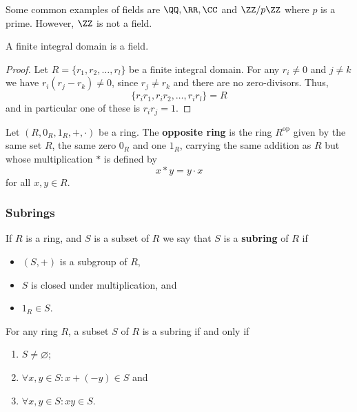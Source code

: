 \documentclass[12pt, a4paper]{article}
\begin{document}
\begin{example}
    Some common examples of fields are \(\QQ,\RR,\CC\) and \(\ZZ/p\ZZ\) where \(p\) is a prime. However, \(\ZZ\) is not a field.
\end{example}

\begin{theorem}
    A finite integral domain is a field.
\end{theorem}

\begin{proof}
    Let \( R = \{r_1,r_2,\ldots,r_l\} \) be a finite integral domain. For any \( r_i \neq 0 \) and \( j \neq k \) we have \( r_i(r_j - r_k) \neq 0 \), since \( r_j \neq r_k \) and there are no zero-divisors. Thus, 
    \[ \{r_ir_1,r_ir_2,\ldots,r_ir_l\} = R \] 
    and in particular one of these is \( r_ir_j = 1 \).
\end{proof}

\begin{definition}
    Let \((R,0_R,1_R,+,\cdot)\) be a ring. The \textbf{opposite ring} is the ring \(R^{\text{op}}\) given by the same set \(R\), the same zero \(0_R\) and one \(1_R\), carrying the same addition as \(R\) but whose multiplication \(*\) is defined by 
    \[x * y=y\cdot x\]
    for all \(x,y \in R\). 
\end{definition}

\subsubsection{Subrings}

\begin{definition}
    If \(R\) is a ring, and \(S\) is a subset of \(R\) we say that \(S\) is a \textbf{subring} of \(R\) if 
    \begin{itemize}
        \item \((S,+)\) is a subgroup of \(R\),
        \item \(S\)  is closed under multiplication, and
        \item \(1_R \in S\).
    \end{itemize}
\end{definition}

\begin{theorem}
    For any ring \(R\), a subset \(S\) of \(R\) is a subring if and only if
    \begin{enumerate}
        \item \(S \neq \varnothing\);
        \item \(\forall x,y \in S : x+(-y) \in S\) and
        \item \(\forall x,y \in S : xy \in S\).
    \end{enumerate}
\end{theorem}
\end{document}
